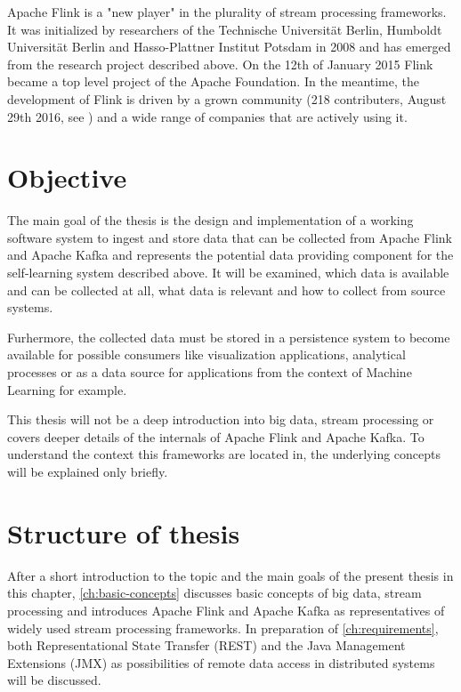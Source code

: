 Apache Flink is a "new player" in the plurality of stream processing frameworks. It
was initialized by researchers of the Technische Universität Berlin, Humboldt Universität
Berlin and Hasso-Plattner Institut Potsdam in 2008 and has emerged from the research
project described above.  On the 12th of January 2015 Flink became a top level project
of the Apache Foundation. In the meantime, the development of Flink is driven by a
grown community (218 contributers, August 29th 2016, see \cite{FlinkG16}) and a wide range of
companies that are actively using it.

\section{Objective}

The main goal of the thesis is the design and implementation of a working software system
to ingest and store data that can be collected from Apache Flink and Apache Kafka and
represents the potential data providing component for the self-learning system described
above. It will be examined, which data is available and can be collected at all, what data
is relevant and how to collect from source systems.

Furhermore, the collected data must be stored in a persistence system to become available
for possible consumers like visualization applications, analytical processes or as a data
source for applications from the context of Machine Learning for example.

This thesis will not be a deep introduction into big data, stream processing or covers deeper
details of the internals of Apache Flink and Apache Kafka. To understand the context this
frameworks are located in, the underlying concepts will be explained only briefly.

\section{Structure of thesis}

After a short introduction to the topic and the main goals of the present thesis in this
chapter, \autoref{ch:basic-concepts} discusses basic concepts of big data, stream processing and introduces
Apache Flink and Apache Kafka as representatives of widely used stream
processing frameworks. In preparation of \autoref{ch:requirements}, both Representational State Transfer (REST)
and the Java Management Extensions (JMX) as possibilities of remote data access in
distributed systems will be discussed.

